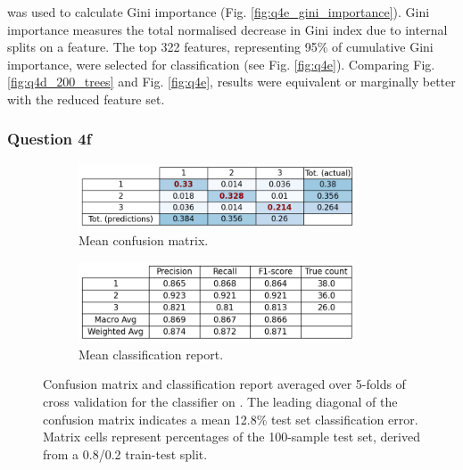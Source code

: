      was used to calculate Gini importance (Fig.
    \eqref{fig:q4e_gini_importance}).
    Gini importance measures the total normalised decrease in Gini index due to internal splits on a feature.
    The top 322 features, representing 95\% of cumulative Gini importance, were selected for classification
    (see Fig. \eqref{fig:q4e}).
    Comparing Fig. \eqref{fig:q4d_200_trees} and Fig. \eqref{fig:q4e}, results were equivalent or marginally better with the
    reduced feature set.

\subsubsection{Question 4f}\label{subsubsec:qf}
    \begin{figure}[htb]
    \centering
    \begin{subfigure}{0.5\textwidth}
        \centering
        \includegraphics[width=0.9\textwidth]{./figures/q4f_confusion_matrix_all_feats}
        \caption{Mean confusion matrix.}
        \label{fig:q4f_confusion_matrix_all_feats}
    \end{subfigure}%
    \begin{subfigure}{0.5\textwidth}
        \centering
        \includegraphics[width=0.9\textwidth]{./figures/q4f_classification_report_all_feats}
        \caption{Mean classification report.}
        \label{fig:q4f_classification_report_all_feats}
    \end{subfigure}
    \caption{Confusion matrix and classification report averaged over 5-folds of cross validation for the
         classifier on .
        The leading diagonal of the confusion matrix indicates a mean 12.8\% test set classification error.
        Matrix cells represent percentages of the 100-sample test set, derived from a 0.8/0.2 train-test split.}
    \label{fig:q4f_all_feats}
    \end{figure}

